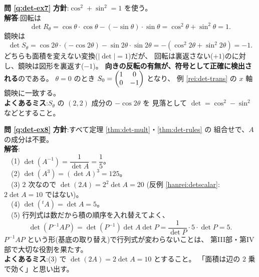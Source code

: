 \bigskip
\noindent\textbf{問 \ref{q:det-ex7}}\quad
\textbf{方針}:$\cos^2 + \sin^2 = 1$ を使う。\\
\textbf{解答}:回転は
\[
\det R_\theta = \cos\theta \cdot \cos\theta - (-\sin\theta) \cdot \sin\theta
= \cos^2\theta + \sin^2\theta = 1.
\]
鏡映は
\[
\det S_\theta = \cos 2\theta \cdot (-\cos 2\theta) - \sin 2\theta \cdot \sin 2\theta
= -(\cos^2 2\theta + \sin^2 2\theta) = -1.
\]
どちらも面積を変えない変換($|\det| = 1$)だが、
回転は裏返さない($+1$)のに対し、鏡映は図形を裏返す($-1$)。
\textbf{向きの反転の有無が、符号として正確に検出される}のである。
$\theta = 0$ のとき $S_0 = \begin{pmatrix}1 & 0 \\ 0 & -1\end{pmatrix}$ となり、
例 \ref{rei:det-trans} の $x$ 軸鏡映に一致する。\\
\textbf{よくあるミス}:$S_\theta$ の $(2,2)$ 成分の $-\cos 2\theta$ を
見落として $\det = \cos^2 - \sin^2$ などとすること。

\bigskip
\noindent\textbf{問 \ref{q:det-ex8}}\quad
\textbf{方針}:すべて定理 \ref{thm:det-mult}・\ref{thm:det-rules} の
組合せで、$A$ の成分は不要。\\
\textbf{解答}:\\
　(1) $\det(A^{-1}) = \dfrac{1}{\det A} = \dfrac{1}{5}$。\\
　(2) $\det(A^3) = (\det A)^3 = 125$。\\
　(3) $2$ 次なので $\det(2A) = 2^2 \det A = 20$
(反例 \ref{hanrei:detscalar}:$2 \det A = 10$ ではない)。\\
　(4) $\det({}^t\!A) = \det A = 5$。\\
　(5) 行列式は数だから積の順序を入れ替えてよく、
\[
\det(P^{-1}AP) = \det(P^{-1}) \det A \det P
= \frac{1}{\det P} \cdot 5 \cdot \det P = 5.
\]
$P^{-1}AP$ という形(基底の取り替え)で行列式が変わらないことは、
第III部・第IV部で大切な役割を果たす。\\
\textbf{よくあるミス}:(3) で $\det(2A) = 2\det A = 10$ とすること。
「面積は辺の $2$ 乗で効く」と思い出す。


